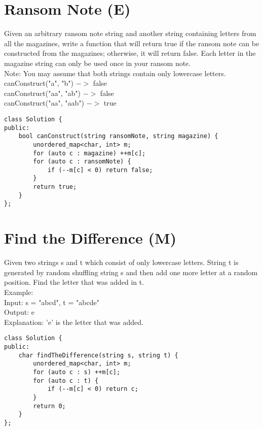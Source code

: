 \section{Ransom Note (E)}
Given an arbitrary ransom note string and another string containing letters from all the magazines, write a function that will return true if the ransom note can be constructed from the magazines; otherwise, it will return false. Each letter in the magazine string can only be used once in your ransom note. \\

Note:
You may assume that both strings contain only lowercase letters.\\

canConstruct("a", "b") $->$ false\\
canConstruct("aa", "ab") $->$ false\\
canConstruct("aa", "aab") $->$ true\\

\begin{lstlisting}
class Solution {
public:
    bool canConstruct(string ransomNote, string magazine) {
        unordered_map<char, int> m;
        for (auto c : magazine) ++m[c];
        for (auto c : ransomNote) {
            if (--m[c] < 0) return false;
        }
        return true;
    }
};
\end{lstlisting}


\section{Find the Difference (M)}
Given two strings s and t which consist of only lowercase letters. String t is generated by random shuffling string s and then add one more letter at a random position. Find the letter that was added in t. \\

Example:\\
Input: s = "abcd", t = "abcde"\\
Output: e\\
Explanation: 'e' is the letter that was added.\\

\begin{lstlisting}
class Solution {
public:
    char findTheDifference(string s, string t) {
        unordered_map<char, int> m;
        for (auto c : s) ++m[c];
        for (auto c : t) {
            if (--m[c] < 0) return c;
        }
        return 0;
    }
};
\end{lstlisting}


